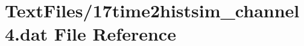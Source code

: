 \hypertarget{17time2histsim__channel4_8dat}{}\section{Text\+Files/17time2histsim\+\_\+channel4.dat File Reference}
\label{17time2histsim__channel4_8dat}
